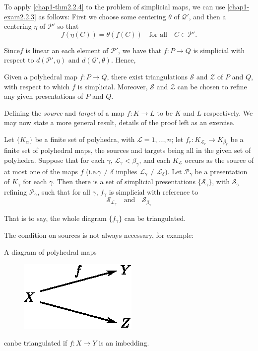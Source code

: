 To apply \ref{chap1-thm2.2.4} to the problem of simplicial maps, we can use 
\ref{chap1-exam2.2.3} as follows: First we choose some centering $\theta$ of $\mathcal{Q}'$, and then a centering $\eta$ of $\mathscr{P}'$ so that
$$
f(\eta(C))=\theta(f(C))\quad\text{for all}\quad C\in \mathscr{P}'.
$$

Since\pageoriginale $f$ is linear an each element of $\mathscr{P}'$, we have that $f:P\to Q$ is simplicial with respect to $d(\mathscr{P}',\eta)$ and $d(\mathcal{Q}',\theta)$. Hence,

\setcounter{proposition}{5}
\begin{corollary}\label{chap1-coro2.2.6}
Given a polyhedral map $f:P\to Q$, there exist triangulations $\mathscr{S}$ and $\mathscr{Z}$ of $P$ and $Q$, with respect to which $f$ is simplicial. Moreover, $\mathscr{S}$ and $\mathscr{Z}$ can be chosen to refine any given presentations of $P$ and $Q$.
\end{corollary}

Defining the {\em source} and {\em target} of a map $f:K\to L$ to be $K$ and $L$ respectively. We may now state a more general result, details of the proof left as an exercise.

\begin{theorem}\label{chap1-thm2.2.7}
Let $\{K_{\alpha}\}$ be a finite set of polyhedra, with $\mathscr{L}=1,\ldots,n$; let $f_{r}:K_{\mathscr{L}_{r}}\to K_{\beta_{r}}$ be a finite set of polyhedral maps, the sources and targets being all in the given set of polyhedra. Suppose that for each $\gamma$, $\mathscr{L}_{\gamma}<\beta_{\gamma}$, and each $K_{\mathscr{L}}$ occurs as the source of at most one of the maps $f$ (i.e.\@ $\gamma\neq \delta$ implies $\mathscr{L}_{\gamma}\neq \mathscr{L}_{\delta}$). Let $\mathscr{P}_{\gamma}$ be a presentation of $K_{\gamma}$ for each $\gamma$. Then there is a set of simplicial presentations $\{\mathscr{S}_{\gamma}\}$, with $\mathscr{S}_{\gamma}$ refining $\mathscr{P}_{\gamma}$, such that for all $\gamma$, $f_{\gamma}$ is simplicial with reference to 
$$
\mathscr{S}_{\mathscr{L}_{\gamma}}\quad\text{and}\quad \mathscr{S}_{\beta_{\gamma}}
$$

That is to say, the whole diagram $\{f_{\gamma}\}$ can be triangulated.
\end{theorem}

The condition on sources is not always necessary, for example:

\begin{ex}\label{chap1-ex2.2.8}
A diagram of polyhedral maps
\begin{figure}[H]
\centering
\includegraphics{figure/fig6.eps}
\end{figure}
\noindent
can\pageoriginale be triangulated if $f:X\to Y$ is an imbedding.
\end{ex}

